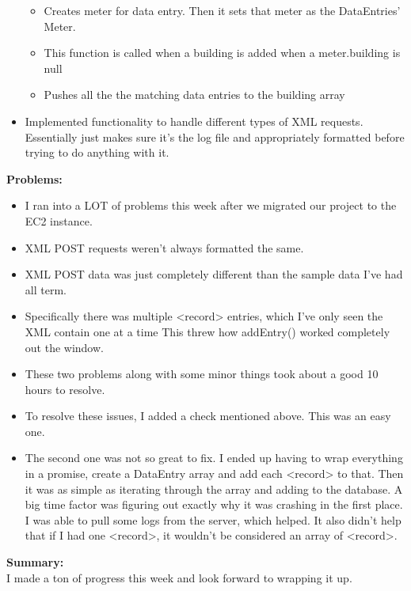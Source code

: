 \begin{adjustwidth}{2.5em}{0pt}
\begin{itemize}
	 \begin{itemize}
		\item Creates meter for data entry. Then it sets that meter as the DataEntries' Meter.
		\item This function is called when a building is added when a meter.building is null
		\item Pushes all the the matching data entries to the building array 
	 \end{itemize} 
	 \item Implemented functionality to handle different types of XML requests. Essentially just makes sure it's the log file and appropriately formatted before trying to do anything with it. 
	\end{itemize} 
    \vspace{-0.3cm}\textbf{Problems:}
    \vspace{-0.5cm}
    \begin{itemize}
        \item I ran into a LOT of problems this week after we migrated our project to the EC2 instance.  
		\item XML POST requests weren't always formatted the same. 
		\item XML POST data was just completely different than the sample data I've had all term. 
		\item Specifically there was multiple <record> entries, which I've only seen the XML contain one at a time This threw how addEntry() worked completely out the window. 
		\item These two problems along with some minor things took about a good 10 hours to resolve. 
		\item To resolve these issues, I added a check mentioned above. This was an easy one. 
		\item The second one was not so great to fix. I ended up having to wrap everything in a promise, create a DataEntry array and add each <record> to that. Then it was as simple as iterating through the array and adding to the database. A big time factor was figuring out exactly why it was crashing in the first place. I was able to pull some logs from the server, which helped. It also didn't help that if I had one <record>, it wouldn't be considered an array of <record>. 
    \end{itemize}  
    \vspace{-0.3cm}\noindent\textbf{Summary:}\\
    \noindent I made a ton of progress this week and look forward to wrapping it up.
\end{adjustwidth} 
